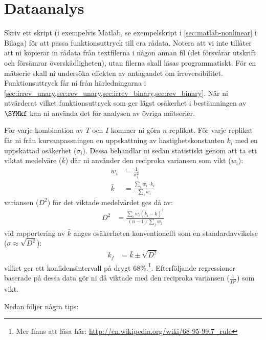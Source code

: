 \section{Dataanalys}
\label{sec:analys}
Skriv ett skript (i exempelvis Matlab, se exempelskript i
\cref{sec:matlab-nonlinear} i Bilaga) för att passa funktionsuttryck till
era rådata. Notera att vi inte tillåter att ni kopierar in rådata från
textfilerna i någon annan fil (det försvårar utskrift och försämrar
överskådligheten), utan filerna skall läsas programmatiskt. För en
mätserie skall ni undersöka effekten av antagandet om
irreversibilitet. Funktionsuttryck får ni från härledningarna i
\cref{sec:irrev_unary,sec:rev_unary,sec:irrev_binary,sec:rev_binary}.
När ni utvärderat vilket funktionsuttryck som ger lägst osäkerhet i
bestämningen av $\SYMkf$ kan ni använda det för analysen av övriga
mätserier.

För varje kombination av $T$ och $I$ kommer ni göra $n$ replikat. För
varje replikat får ni från kurvanpassningen en uppskattning av
hastighetskonstanten $k_i$ med en uppskattad osäkerhet
($\sigma_i$). Dessa behandlar ni sedan statistiskt genom att ta ett
viktat medelväre ($\bar{k}$) där ni använder den reciproka variansen som
vikt ($w_i$):
\begin{align}
  w_i &= \frac{1}{\sigma_i^2} \\
  \bar{k} &= \frac{\sum_i{w_i \cdot k_i}}{\sum_i{w_i}}
\end{align}
variansen ($D^2$) för det viktade medelvärdet ges då av:
\begin{align}
   D^2 &= \frac{\sum_i w_i(k_i - \bar{k})^2}{(n - 1)\sum_j w_j}
\end{align}
vid rapportering av $\bar{k}$ anges osäkerheten konventionellt som en
standardavvikelse ($\sigma \approx \sqrt{D^2}$):
\begin{align}
  k_f &= \bar{k} \pm \sqrt{D^2}
\end{align}
vilket ger ett konfidensintervall på drygt 68\%.\footnote{
Mer finns att läsa här:
\url{http://en.wikipedia.org/wiki/68-95-99.7\_rule}
}. Efterföljande regressioner baserade på dessa
data gör ni då viktade med den reciproka variansen ($\frac{1}{D^2}$) som
vikt.

Nedan följer några tips:

